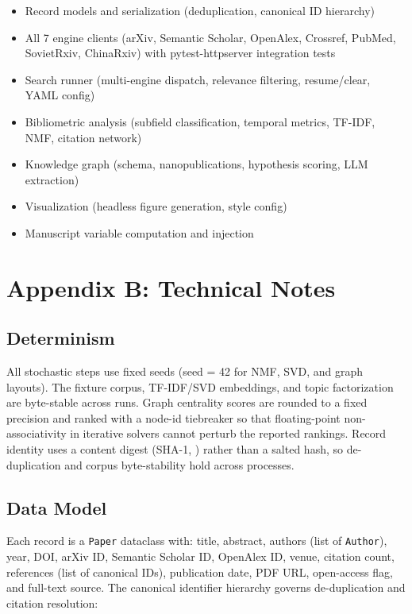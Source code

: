 \documentclass[
  english,
]{article}
\providecommand{\tightlist}{%
  \setlength{\itemsep}{0pt}\setlength{\parskip}{0pt}}
\begin{document}
\begin{itemize}
\tightlist
\item
  Record models and serialization (deduplication, canonical ID
  hierarchy)
\item
  All 7 engine clients (arXiv, Semantic Scholar, OpenAlex, Crossref,
  PubMed, SovietRxiv, ChinaRxiv) with pytest-httpserver integration
  tests
\item
  Search runner (multi-engine dispatch, relevance filtering,
  resume/clear, YAML config)
\item
  Bibliometric analysis (subfield classification, temporal metrics,
  TF-IDF, NMF, citation network)
\item
  Knowledge graph (schema, nanopublications, hypothesis scoring, LLM
  extraction)
\item
  Visualization (headless figure generation, style config)
\item
  Manuscript variable computation and injection
\end{itemize}

\newpage

\section{Appendix B: Technical Notes}\label{appendix-b-technical-notes}

\subsection{Determinism}\label{determinism}

All stochastic steps use fixed seeds (seed = 42 for NMF, SVD, and graph
layouts). The fixture corpus, TF-IDF/SVD embeddings, and topic
factorization are byte-stable across runs. Graph centrality scores are
rounded to a fixed precision and ranked with a node-id tiebreaker so
that floating-point non-associativity in iterative solvers cannot
perturb the reported rankings. Record identity uses a content digest
(SHA-1, ) rather than a salted hash, so
de-duplication and corpus byte-stability hold across processes.

\subsection{Data Model}\label{data-model}

Each record is a \texttt{Paper} dataclass with: title, abstract, authors
(list of \texttt{Author}), year, DOI, arXiv ID, Semantic Scholar ID,
OpenAlex ID, venue, citation count, references (list of canonical IDs),
publication date, PDF URL, open-access flag, and full-text source. The
canonical identifier hierarchy governs de-duplication and citation
resolution:
\end{document}
